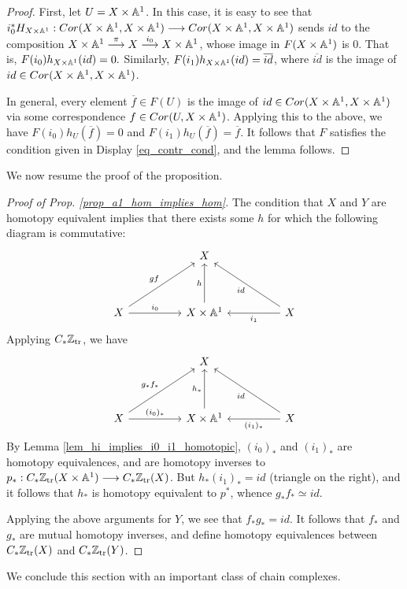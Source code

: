 \begin{proof}
First, let $U = X \times \mathbb{A}^1$. In this case, it is easy to see
that $i_0^* H_{X \times \mathbb{A}^1} : Cor(X \times \mathbb{A}^1, X \times \mathbb{A}^1) 
\longrightarrow Cor( X \times \mathbb{A}^1, X \times \mathbb{A}^1)$ sends $id$ to the 
composition $X \times \mathbb{A}^1 \stackrel{\pi}{\longrightarrow} X 
\stackrel{i_0}{\longrightarrow} X \times \mathbb{A}^1$, whose image in $F(X \times 
\mathbb{A}^1)$ is 0. That is, $F(i_0)h_{X \times \mathbb{A}^1}(id) = 0.$ 
Similarly, $F(i_1)h_{X \times \mathbb{A}^1}(id) = \overline{id}$, where
$\overline{id}$ is the image of $id \in Cor(X \times \mathbb{A}^1, X 
\times \mathbb{A}^1)$. 

In general, every element $\overline{f} \in F(U)$ is the image
of $id \in Cor(X \times \mathbb{A}^1, X \times \mathbb{A}^1)$ via some 
correspondence $f \in Cor(U, X \times \mathbb{A}^1)$. Applying this
to the above, we have $F(i_0)h_U(\overline{f}) = 0$ and $F(i_1)
h_U(\overline{f}) = \overline{f}$. It follows that $F$ satisfies
the condition given in Display \ref{eq_contr_cond}, and the lemma
follows.
\end{proof}

We now resume the proof of the proposition.

\begin{proof}[Proof of Prop. \ref{prop_a1_hom_implies_hom}]
The condition that $X$ and $Y$ are homotopy equivalent implies
that there exists some $h$ for which the following diagram is
commutative:
\[
\begin{tikzcd}[column sep=huge, row sep=huge]
{}& X \\
X \arrow{ru}{gf} \arrow{r}{i_0} &
X \times \A^1 \arrow{u}{h} &
X \arrow{l}{i_1} \arrow{lu}{id}
\end{tikzcd}
\]
Applying $C_{*} \mathbb{Z}_{\mathrm{tr}}$, we have
\[
\begin{tikzcd}[column sep=huge, row sep=huge]
{}& X \\
X \arrow{ru}{g_*f_*} \arrow{r}{(i_0)_*} &
X \times \A^1 \arrow{u}{h_*} &
X \arrow{l}{(i_1)_*} \arrow{lu}{id}
\end{tikzcd}
\]
By Lemma \ref{lem_hi_implies_i0_i1_homotopic}, $(i_0)_*$ and 
$(i_1)_*$ are homotopy equivalences, and are homotopy inverses to 
$p_* : C_{*} \mathbb{Z}_{\mathrm{tr}}(X \times \mathbb{A}^1) \longrightarrow C_{*} \mathbb{Z}_{\mathrm{tr}}(X)$. But 
$h_* (i_1)_* = id$ (triangle on the right), and it follows that 
$h_*$ is homotopy equivalent to $p^*$, whence $g_*f_* \simeq id$.

Applying the above arguments for $Y$, we see that $f_*g_* = id$.
It follows that $f_*$ and $g_*$ are mutual homotopy inverses, and
define homotopy equivalences between $C_{*} \mathbb{Z}_{\mathrm{tr}}(X)$ and $C_{*}
\mathbb{Z}_{\mathrm{tr}}(Y)$.
\end{proof}

We conclude this section with an important class of chain
complexes.
